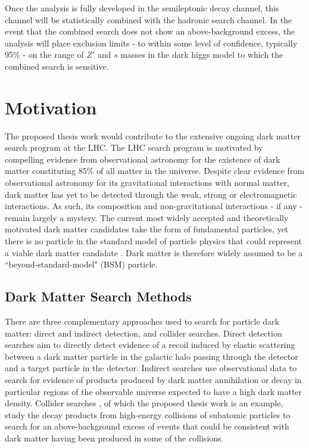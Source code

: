 \documentclass[12pt]{article}
\begin{document}
Once the analysis is fully developed in the semileptonic decay channel, this channel will be statistically combined with the hadronic search channel. In the event that the combined search does not show an above-background excess, the analysis will place exclusion limits - to within some level of confidence, typically 95\% - on the range of $Z'$ and $s$ masses in the dark higgs model to which the combined search is sensitive.

\section{Motivation}

The proposed thesis work would contribute to the extensive ongoing dark matter search program at the LHC. The LHC search program is motivated by compelling evidence from observational astronomy for the existence of dark matter constituting 85\% \cite{planck} of all matter in the universe. Despite clear evidence from observational astronomy for its gravitational interactions with normal matter, dark matter has yet to be detected through the weak, strong or electromagnetic interactions. As such, its composition and non-gravitational interactions - if any - remain largely a mystery. The current most widely accepted and theoretically motivated dark matter candidates take the form of fundamental particles, yet there is no particle in the standard model of particle physics that could represent a viable dark matter candidate \cite{feng}. Dark matter is therefore widely assumed to be a ``beyond-standard-model" (BSM) particle. 

\subsection{Dark Matter Search Methods}
There are three complementary approaches used to search for particle dark matter: direct and indirect detection, and collider searches. Direct detection searches \cite{Schumann_2019, 2015gya} aim to directly detect evidence of a recoil induced by elastic scattering between a dark matter particle in the galactic halo passing through the detector and a target particle in the detector. Indirect searches \cite{CIRELLI_2012, conrad} use observational data to search for evidence of products produced by dark matter annihilation or decay in particular regions of the observable universe expected to have a high dark matter density. Collider searches \cite{DM_colliders}, of which the proposed thesis work is an example, study the decay products from high-energy collisions of subatomic particles to search for an above-background excess of events that could be consistent with dark matter having been produced in some of the collisions.
\end{document}
